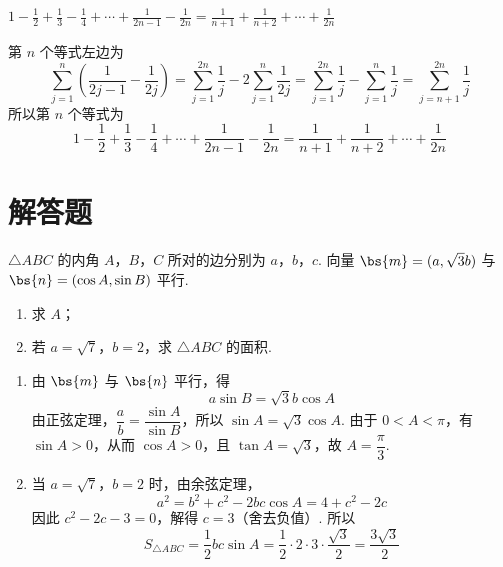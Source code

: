 \begin{answer}
\(\displaystyle 1 - \frac{1}{2} + \frac{1}{3} - \frac{1}{4} + \cdots + \frac{1}{2n-1} - \frac{1}{2n} = \frac{1}{n+1} + \frac{1}{n+2} + \cdots + \frac{1}{2n}\)
\end{answer}

\begin{solution}
第 \(n\) 个等式左边为
\[
\sum_{j=1}^{n}\left(\frac{1}{2j-1}-\frac{1}{2j}\right)=\sum_{j=1}^{2n}\frac{1}{j}-2\sum_{j=1}^{n}\frac{1}{2j}=\sum_{j=1}^{2n}\frac{1}{j}-\sum_{j=1}^{n}\frac{1}{j}=\sum_{j=n+1}^{2n}\frac{1}{j}
\]
所以第 \(n\) 个等式为
\[
1-\frac{1}{2}+\frac{1}{3}-\frac{1}{4}+\cdots+\frac{1}{2n-1}-\frac{1}{2n}=\frac{1}{n+1}+\frac{1}{n+2}+\cdots+\frac{1}{2n}
\]
\end{solution}

\section{解答题}

\begin{problem}
\(\triangle ABC\) 的内角 \(A\)，\(B\)，\(C\) 所对的边分别为 \(a\)，\(b\)，\(c\). 向量 \(\bs{m} = (a, \sqrt{3}b)\) 与 \(\bs{n} = (\cos A, \sin B)\) 平行.
\begin{enumerate}
\item 求 \(A\)；
\item 若 \(a = \sqrt{7}\)，\(b = 2\)，求 \(\triangle ABC\) 的面积.
\end{enumerate}
\end{problem}

\begin{solution}
\begin{enumerate}
\item
由 \(\bs{m}\) 与 \(\bs{n}\) 平行，得
\[
a\sin B=\sqrt{3}b\cos A
\]
由正弦定理，\(\dfrac{a}{b}=\dfrac{\sin A}{\sin B}\)，所以 \(\sin A=\sqrt{3}\cos A\). 由于 \(0<A<\pi\)，有 \(\sin A>0\)，从而 \(\cos A>0\)，且 \(\tan A=\sqrt{3}\)，故 \(A=\dfrac{\pi}{3}\).

\item
当 \(a=\sqrt{7}\)，\(b=2\) 时，由余弦定理，
\[
a^2=b^2+c^2-2bc\cos A=4+c^2-2c
\]
因此 \(c^2-2c-3=0\)，解得 \(c=3\)（舍去负值）. 所以
\[
S_{\triangle ABC}=\frac{1}{2}bc\sin A=\frac{1}{2}\cdot2\cdot3\cdot\frac{\sqrt{3}}{2}=\frac{3\sqrt{3}}{2}
\]
\end{enumerate}
\end{solution}

